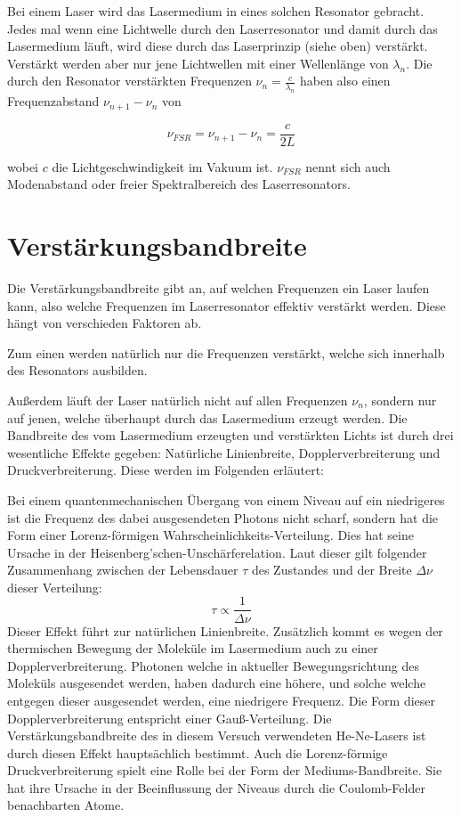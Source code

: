 \documentclass[bigchapter,colorback,accentcolor=tud4b,linedtoc,11pt]{tudreport}
\numberwithin{equation}{subsection}
\begin{document}
Bei einem Laser wird das Lasermedium in eines solchen Resonator gebracht. Jedes mal wenn eine Lichtwelle durch den Laserresonator und damit durch das Lasermedium läuft, wird diese durch das Laserprinzip (siehe oben) verstärkt. Verstärkt werden aber nur jene Lichtwellen mit einer Wellenlänge von \(\lambda_n\). Die durch den Resonator verstärkten Frequenzen \(\nu_n = \frac{c}{\lambda_n}\) haben also einen Frequenzabstand $\nu_{n+1} - \nu_n$ von

$$ \nu_{FSR} = \nu_{n+1} - \nu_n = \frac{c}{2L} $$

wobei $c$ die Lichtgeschwindigkeit im Vakuum ist. $\nu_{FSR}$ nennt sich auch Modenabstand oder freier Spektralbereich des Laserresonators.

\section{Verstärkungsbandbreite}

Die Verstärkungsbandbreite gibt an, auf welchen Frequenzen ein Laser laufen kann, also welche Frequenzen im Laserresonator effektiv verstärkt werden. Diese hängt von verschieden Faktoren ab.

Zum einen werden natürlich nur die Frequenzen verstärkt, welche sich innerhalb des Resonators ausbilden.

Außerdem läuft der Laser natürlich nicht auf allen Frequenzen $\nu_n$, sondern nur auf jenen, welche überhaupt durch das Lasermedium erzeugt werden. Die Bandbreite des vom Lasermedium erzeugten und verstärkten Lichts ist durch drei wesentliche Effekte gegeben: Natürliche Linienbreite, Dopplerverbreiterung und Druckverbreiterung. Diese werden im Folgenden erläutert:

Bei einem quantenmechanischen Übergang von einem Niveau auf ein niedrigeres ist die Frequenz des dabei ausgesendeten Photons nicht scharf, sondern hat die Form einer Lorenz-förmigen Wahrscheinlichkeits-Verteilung. Dies hat seine Ursache in der Heisenberg'schen-Unschärferelation. Laut dieser gilt folgender Zusammenhang zwischen der Lebensdauer $\tau$ des Zustandes und der Breite $\Delta\nu$ dieser Verteilung:
$$ \tau \propto \frac{1}{\Delta\nu} $$
Dieser Effekt führt zur natürlichen Linienbreite.
Zusätzlich kommt es wegen der thermischen Bewegung der Moleküle im Lasermedium auch zu einer Dopplerverbreiterung. Photonen welche in aktueller Bewegungsrichtung des Moleküls ausgesendet werden, haben dadurch eine höhere, und solche welche entgegen dieser ausgesendet werden, eine niedrigere Frequenz. Die Form dieser Dopplerverbreiterung entspricht einer Gauß-Verteilung. Die Verstärkungsbandbreite des in diesem Versuch verwendeten He-Ne-Lasers ist durch diesen Effekt hauptsächlich bestimmt.
Auch die Lorenz-förmige Druckverbreiterung spielt eine Rolle bei der Form der Mediums-Bandbreite. Sie hat ihre Ursache in der Beeinflussung der Niveaus durch die Coulomb-Felder benachbarten Atome.
\end{document}
